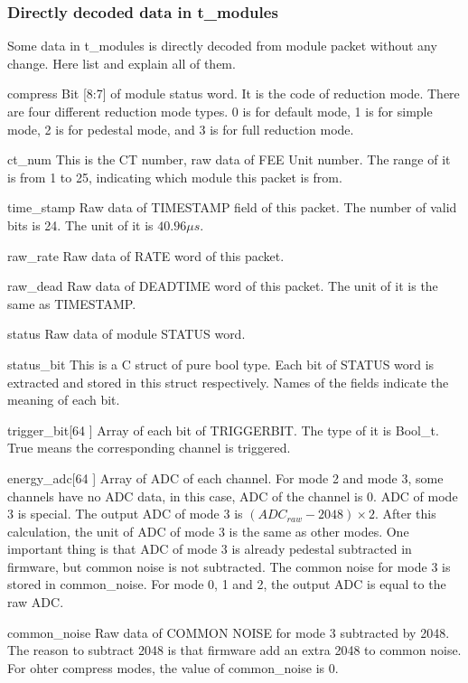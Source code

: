 \documentclass[a4paper, 12pt, onecolumn]{article}
\begin{document}
\subsubsection{Directly decoded data in t\_modules}
Some data in t\_modules is directly decoded from module packet without any change. Here list and explain all of them.

\begin{asparadesc}
\item[compress] Bit [8:7] of module status word. It is the code of reduction mode. There are four different reduction mode types.
  0 is for default mode, 1 is for simple mode, 2 is for pedestal mode, and 3 is for full reduction mode.
\item[ct\_num] This is the CT number, raw data of FEE Unit number. The range of it is from 1 to 25, indicating which module this packet is from.
\item[time\_stamp] Raw data of TIMESTAMP field of this packet. The number of valid bits is 24. The unit of it is $40.96\mu s$.
\item[raw\_rate] Raw data of RATE word of this packet.
\item[raw\_dead] Raw data of DEADTIME word of this packet. The unit of it is the same as TIMESTAMP.
\item[status] Raw data of module STATUS word.
\item[status\_bit] This is a C struct of pure bool type. Each bit of STATUS word is extracted and stored in this struct respectively.
  Names of the fields indicate the meaning of each bit.
\item[trigger\_bit[64]] Array of each bit of TRIGGERBIT. The type of it is Bool\_t. True means the corresponding channel is triggered.
\item[energy\_adc[64]] Array of ADC of each channel. For mode 2 and mode 3, some channels have no ADC data, in this case, ADC of the channel is 0.
  ADC of mode 3 is special. The output ADC of mode 3 is $(ADC_{raw} - 2048) \times 2$. After this calculation, the unit of ADC of mode 3 is the same as other modes.
  One important thing is that ADC of mode 3 is already pedestal subtracted in firmware, but common noise is not subtracted.
  The common noise for mode 3 is stored in common\_noise.
  For mode 0, 1 and 2, the output ADC is equal to the raw ADC.
\item[common\_noise] Raw data of COMMON NOISE for mode 3 subtracted by 2048. The reason to subtract 2048 is that firmware add an extra 2048 to common noise.
  For ohter compress modes, the value of common\_noise is 0.
\end{asparadesc}
\end{document}
